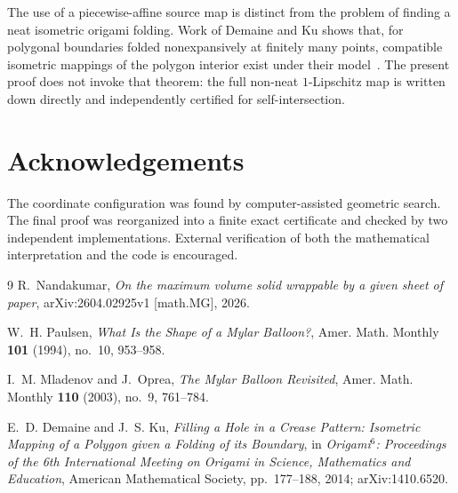 The use of a piecewise-affine source map is distinct from the problem of finding a neat isometric origami folding.  Work of Demaine and Ku shows that, for polygonal boundaries folded nonexpansively at finitely many points, compatible isometric mappings of the polygon interior exist under their model~\cite{DemaineKu2014}.  The present proof does not invoke that theorem: the full non-neat $1$-Lipschitz map is written down directly and independently certified for self-intersection.

\section*{Acknowledgements}
The coordinate configuration was found by computer-assisted geometric search.  The final proof was reorganized into a finite exact certificate and checked by two independent implementations.  External verification of both the mathematical interpretation and the code is encouraged.

\begin{thebibliography}{9}
R.~Nandakumar,
\newblock \emph{On the maximum volume solid wrappable by a given sheet of paper},
\newblock arXiv:2604.02925v1 [math.MG], 2026.

W.~H. Paulsen,
\newblock \emph{What Is the Shape of a Mylar Balloon?},
\newblock Amer. Math. Monthly \textbf{101} (1994), no.~10, 953--958.

I.~M. Mladenov and J.~Oprea,
\newblock \emph{The Mylar Balloon Revisited},
\newblock Amer. Math. Monthly \textbf{110} (2003), no.~9, 761--784.

E.~D. Demaine and J.~S. Ku,
\newblock \emph{Filling a Hole in a Crease Pattern: Isometric Mapping of a Polygon given a Folding of its Boundary},
\newblock in \emph{Origami$^6$: Proceedings of the 6th International Meeting on Origami in Science, Mathematics and Education}, American Mathematical Society, pp.~177--188, 2014; arXiv:1410.6520.
\end{thebibliography}

